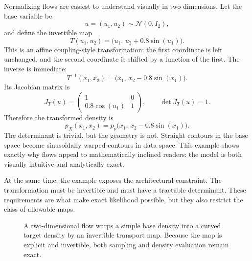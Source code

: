 Normalizing flows are easiest to understand visually in two dimensions.
Let the base variable be
\[
u=(u_1,u_2)\sim \mathcal{N}(0,I_2),
\]
and define the invertible map
\[
T(u_1,u_2)=\bigl(u_1,\,u_2+0.8\sin(u_1)\bigr).
\]
This is an affine coupling-style transformation: the first coordinate is left unchanged, and the second coordinate is shifted by a function of the first.
The inverse is immediate:
\[
T^{-1}(x_1,x_2)=\bigl(x_1,\,x_2-0.8\sin(x_1)\bigr).
\]
Its Jacobian matrix is
\[
J_T(u)=
\begin{pmatrix}
1 & 0 \\
0.8\cos(u_1) & 1
\end{pmatrix},
\qquad
\det J_T(u)=1.
\]
Therefore the transformed density is
\[
p_X(x_1,x_2)=p_\nu\bigl(x_1,\,x_2-0.8\sin(x_1)\bigr).
\]
The determinant is trivial, but the geometry is not.
Straight contours in the base space become sinusoidally warped contours in data space.
This example shows exactly why flows appeal to mathematically inclined readers:
the model is both visually intuitive and analytically exact.

At the same time, the example exposes the architectural constraint.
The transformation must be invertible and must have a tractable determinant.
These requirements are what make exact likelihood possible, but they also restrict the class of allowable maps.

\begin{figure}[h]
\centering
{}
\caption{A two-dimensional flow warps a simple base density into a curved target density by an invertible transport map. Because the map is explicit and invertible, both sampling and density evaluation remain exact.}
\label{fig:flowwarping}
\end{figure}

